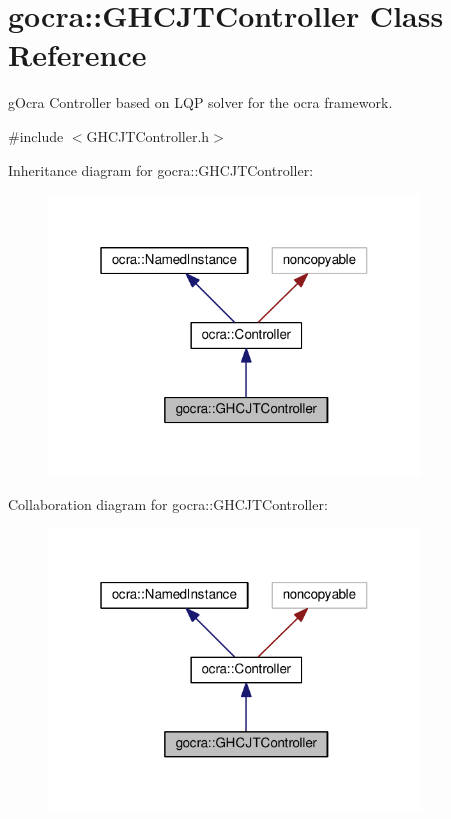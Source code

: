 \hypertarget{classgocra_1_1GHCJTController}{}\section{gocra\+:\+:G\+H\+C\+J\+T\+Controller Class Reference}
\label{classgocra_1_1GHCJTController}


g\+Ocra Controller based on L\+QP solver for the ocra framework.  




{\ttfamily \#include $<$G\+H\+C\+J\+T\+Controller.\+h$>$}



Inheritance diagram for gocra\+:\+:G\+H\+C\+J\+T\+Controller\+:
\nopagebreak
\begin{figure}[H]
\begin{center}
\leavevmode
\includegraphics[width=280pt]{dd/d8e/classgocra_1_1GHCJTController__inherit__graph}
\end{center}
\end{figure}


Collaboration diagram for gocra\+:\+:G\+H\+C\+J\+T\+Controller\+:
\nopagebreak
\begin{figure}[H]
\begin{center}
\leavevmode
\includegraphics[width=280pt]{dd/d5b/classgocra_1_1GHCJTController__coll__graph}
\end{center}
\end{figure}
